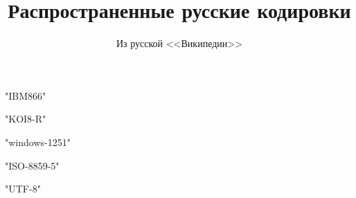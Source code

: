 ﻿\documentclass{article}
\title{Распространенные русские кодировки}
\author{Из русской <<Википедии>>}
\date{}
\begin{document}
\maketitle

\tableofcontents


\XeTeXdefaultencoding "IBM866"


\XeTeXdefaultencoding "KOI8-R"


\XeTeXdefaultencoding "windows-1251"


\XeTeXdefaultencoding "ISO-8859-5"


\XeTeXdefaultencoding "UTF-8"
\end{document}
